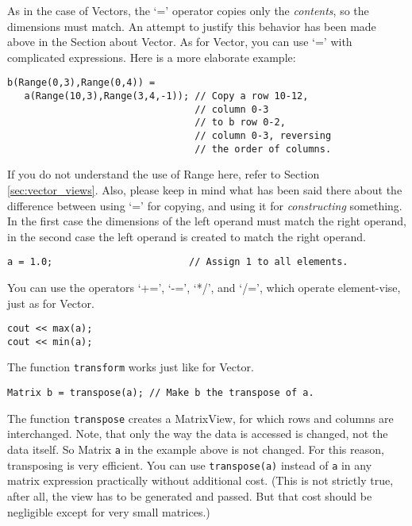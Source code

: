 As in the case of Vectors, the `=' operator copies only the
\emph{contents}, so the dimensions must match. An attempt to justify
this behavior has been made above in the Section about Vector. As for
Vector, you can use `=' with complicated expressions. Here is a more
elaborate example:

\begin{verbatim}
b(Range(0,3),Range(0,4)) =
   a(Range(10,3),Range(3,4,-1)); // Copy a row 10-12,
                                 // column 0-3 
                                 // to b row 0-2,
                                 // column 0-3, reversing
                                 // the order of columns.
\end{verbatim}

If you do not understand the use of Range here, refer to Section
\ref{sec:vector_views}. Also, please keep in mind what has been said
there about the difference between using `=' for copying, and using it
for \emph{constructing} something. In the first case the dimensions of
the left operand must match the right operand, in the second case the
left operand is created to match the right operand.

\begin{verbatim}
a = 1.0;                        // Assign 1 to all elements.
\end{verbatim}


You can use the operators `+=', `-=', `*/', and `/=', which operate
element-vise, just as for Vector.

\begin{verbatim}
cout << max(a);
cout << min(a);
\end{verbatim}


The function \verb|transform| works just like for Vector.

\begin{verbatim}
Matrix b = transpose(a); // Make b the transpose of a.
\end{verbatim}

The function \verb|transpose| creates a MatrixView, for which rows and
columns are interchanged. Note, that only the way the data is accessed
is changed, not the data itself. So Matrix \verb|a| in the example
above is not changed. For this reason, transposing is very efficient.
You can use \verb|transpose(a)| instead of \verb|a| in any matrix
expression practically without additional cost. (This is not strictly
true, after all, the view has to be generated and passed. But that
cost should be negligible except for very small matrices.)


